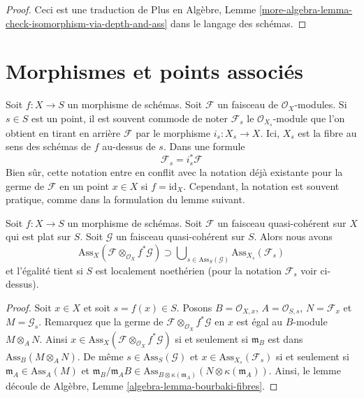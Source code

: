\begin{proof}
Ceci est une traduction de Plus en Algèbre, Lemme  \ref{more-algebra-lemma-check-isomorphism-via-depth-and-ass}  dans le langage des
schémas.
\end{proof}




\section{Morphismes et points associés}
\label{section-morphisms-associated}

\noindent
Soit  $f : X \to S$  un morphisme de schémas. Soit  $\mathcal{F}$  un faisceau de
 $\mathcal{O}_X$-modules. Si  $s \in S$  est un point, il est souvent commode de
noter  $\mathcal{F}_s$  le  $\mathcal{O}_{X_s}$-module que l'on obtient en tirant en arrière
 $\mathcal{F}$  par le morphisme  $i_s : X_s \to X$. Ici,  $X_s$  est la fibre au sens
des schémas de  $f$  au-dessus de  $s$. Dans une formule
$$
\mathcal{F}_s = i_s^*\mathcal{F}
$$
Bien sûr, cette notation entre en conflit avec la notation déjà existante pour la
germe de  $\mathcal{F}$  en un point  $x \in X$  si  $f = \text{id}_X$. Cependant, la
notation est souvent pratique, comme dans la formulation du lemme suivant.

\begin{lemma}
\label{lemma-bourbaki}
Soit  $f : X \to S$  un morphisme de schémas. Soit  $\mathcal{F}$  un faisceau
quasi-cohérent sur  $X$  qui est plat sur  $S$. Soit  $\mathcal{G}$ 
un faisceau quasi-cohérent sur  $S$. Alors nous avons
$$
\text{Ass}_X(\mathcal{F} \otimes_{\mathcal{O}_X} f^*\mathcal{G})
\supset
\bigcup\nolimits_{s \in \text{Ass}_S(\mathcal{G})}
\text{Ass}_{X_s}(\mathcal{F}_s)
$$
et l'égalité tient si  $S$  est localement noethérien (pour la notation
 $\mathcal{F}_s$  voir ci-dessus).
\end{lemma}

\begin{proof}
Soit  $x \in X$  et soit  $s = f(x) \in S$. Posons  $B = \mathcal{O}_{X, x}$,  $A = \mathcal{O}_{S, s}$,
 $N = \mathcal{F}_x$ et  $M = \mathcal{G}_s$. Remarquez que la germe de  $\mathcal{F} \otimes_{\mathcal{O}_X} f^*\mathcal{G}$  en
 $x$  est égal au  $B$-module  $M \otimes_A N$. Ainsi  $x \in \text{Ass}_X(\mathcal{F} \otimes_{\mathcal{O}_X} f^*\mathcal{G})$  si
et seulement si  $\mathfrak m_B$  est dans  $\text{Ass}_B(M \otimes_A N)$. De même  $s \in \text{Ass}_S(\mathcal{G})$  et
 $x \in \text{Ass}_{X_s}(\mathcal{F}_s)$  si et seulement si  $\mathfrak m_A \in \text{Ass}_A(M)$  et  $\mathfrak m_B/\mathfrak m_A B \in
\text{Ass}_{B \otimes \kappa(\mathfrak m_A)}(N \otimes \kappa(\mathfrak m_A))$. Ainsi, le lemme
découle de Algèbre, Lemme  \ref{algebra-lemma-bourbaki-fibres}.
\end{proof}





